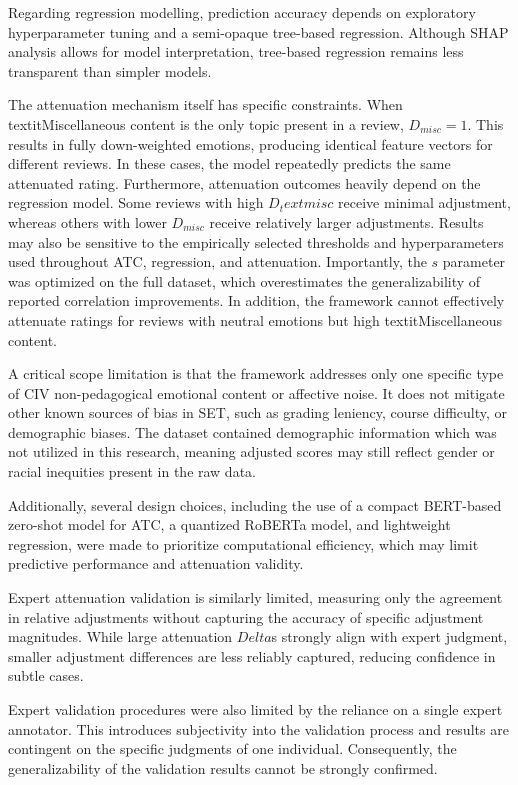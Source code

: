 Regarding regression modelling, prediction accuracy depends on exploratory hyperparameter tuning and a semi-opaque tree-based regression. Although SHAP analysis allows for model interpretation, tree-based regression remains less transparent than simpler models.

The attenuation mechanism itself has specific constraints. When textit{Miscellaneous} content is the only topic present in a review, $D_{misc} = 1$. This results in fully down-weighted emotions, producing identical feature vectors for different reviews. In these cases, the model repeatedly predicts the same attenuated rating. Furthermore, attenuation outcomes heavily depend on the regression model. Some reviews with high $D_text{misc}$ receive minimal adjustment, whereas others with lower $D_{misc}$ receive relatively larger adjustments. Results may also be sensitive to the empirically selected thresholds and hyperparameters used throughout ATC, regression, and attenuation. Importantly, the $s$ parameter was optimized on the full dataset, which overestimates the generalizability of reported correlation improvements. In addition, the framework cannot effectively attenuate ratings for reviews with neutral emotions but high textit{Miscellaneous} content.

A critical scope limitation is that the framework addresses only one specific type of CIV non-pedagogical emotional content or affective noise. It does not mitigate other known sources of bias in SET, such as grading leniency, course difficulty, or demographic biases. The dataset contained demographic information which was not utilized in this research, meaning adjusted scores may still reflect gender or racial inequities present in the raw data.

Additionally, several design choices, including the use of a compact BERT-based zero-shot model for ATC, a quantized RoBERTa model, and lightweight regression, were made to prioritize computational efficiency, which may limit predictive performance and attenuation validity.

Expert attenuation validation is similarly limited, measuring only the agreement in relative adjustments without capturing the accuracy of specific adjustment magnitudes. While large attenuation $Delta$s strongly align with expert judgment, smaller adjustment differences are less reliably captured, reducing confidence in subtle cases. 

Expert validation procedures were also limited by the reliance on a single expert annotator. This introduces subjectivity into the validation process and results are contingent on the specific judgments of one individual. Consequently, the generalizability of the validation results cannot be strongly confirmed.

